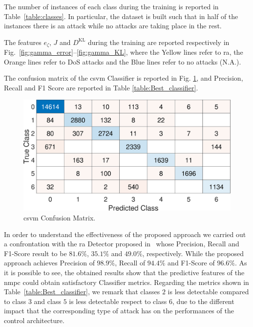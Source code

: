 The number of instances of each class during the training is reported in Table~\ref{table:classes}. In particular, the dataset is built such that in half of the instances there is an attack while no attacks are taking place in the rest.

The features $e_{\zeta}$, $J$ and $D^{\mathrm{KL}}$ during the training are reported respectively in Fig.~\ref{fig:gamma_error}--\ref{fig:gamma_KL}, where the Yellow lines refer to \gls{ra}, the Orange lines refer to DoS attacks and the Blue lines refer to no attacks (N.A.).

The confusion matrix of the \gls{csvm} Classifier is reported in Fig. \ref{fig:Confusion_matrix}, and Precision, Recall and F1 Score are reported in Table \ref{table:Best_classifier}.
%
\begin{figure}[h]
	\centering
	\includegraphics[scale=0.35]{figure/Part2/Chapter6/Figures/Confusion_matrix.eps}
	\caption{\gls{csvm} Confusion Matrix. }
	\label{fig:Confusion_matrix}
\end{figure}
%
%
%
%
In order to understand the effectiveness of the proposed approach we carried out a confrontation with the \gls{ra} Detector proposed in~\cite{detection_1} whose Precision, Recall and F1-Score result to be $81.6\%$, $35.1\%$ and $49.0\%$, respectively. While the proposed approach achieves Precision of $98.9\%$, Recall of $94.4\%$ and F1-Score of $96.6\%$. As it is possible to see, the obtained results show that the predictive features of the \gls{nmpc} could obtain satisfactory Classifier metrics. Regarding the metrics shown in Table~\ref{table:Best_classifier}, we remark that classes $2$ is less detectable compared to class $3$ and class $5$ is less detectable respect to class $6$, due to the different impact that the corresponding type of attack has on the performances of the control architecture.  
%
